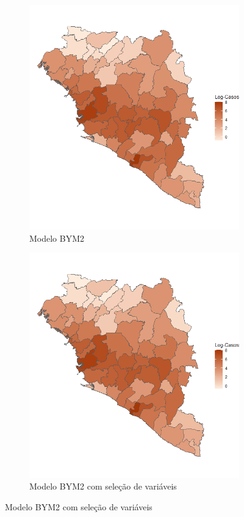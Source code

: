 \begin{figure}
\medskip
\begin{subfigure}{0.38\textwidth}
\includegraphics[width=\linewidth]{images/posterior_mean_bym2.png}
\caption{Modelo BYM2} \label{fig:e}
\end{subfigure}\hspace*{\fill}
\begin{subfigure}{0.38\textwidth}
\includegraphics[width=\linewidth]{images/posterior_mean_bym2_ssvs.png}
\caption{Modelo BYM2 com seleção de variáveis} \label{fig:f}
\end{subfigure}


\end{figure}

